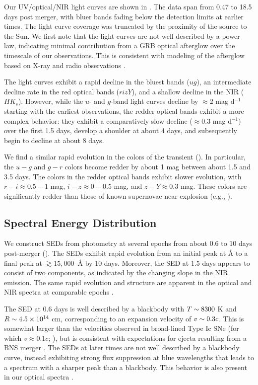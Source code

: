 Our UV/optical/NIR light curves are shown in . The data span from 0.47 to 18.5 days post merger, with bluer bands fading below the detection limits at earlier times.  The light curve coverage was truncated by the proximity of the source to the Sun.  We first note that the light curves are not well described by a power law, indicating minimal contribution from a GRB optical afterglow over the timescale of our observations. This is consistent with modeling of the afterglow based on X-ray and radio observations \citep{Alexander+17,Margutti+17}.

The light curves exhibit a rapid decline in the bluest bands ($ug$), an intermediate decline rate in the red optical bands ($rizY$), and a shallow decline in the NIR ($HK_s$).  However, while the $u$- and $g$-band light curves decline by $\approx 2$ mag d$^{-1}$ starting with the earliest observations, the redder optical bands exhibit a more complex behavior: they exhibit a comparatively slow decline ($\approx0.3$ mag d$^{-1}$) over the first 1.5 days, develop a shoulder at about 4 days, and subsequently begin to decline at about 8 days.

We find a similar rapid evolution in the colors of the transient ().  In particular, the $u-g$ and $g-r$ colors become redder by about 1 mag between about 1.5 and 3.5 days.  The colors in the redder optical bands exhibit slower evolution, with $r-i\approx 0.5-1$ mag, $i-z\approx 0-0.5$ mag, and $z-Y\approx 0.3$ mag.  These colors are significantly redder than those of known supernovae near explosion (e.g., \citealt{Folatelli+10,Bianco+14,Galbany+16}).

\subsection{Spectral Energy Distribution}
\label{sec:ch5_SED}

We construct SEDs from photometry at several epochs from about 0.6 to 10 days post-merger (). The SEDs exhibit rapid evolution from an initial peak at  $\mbox{\AA}$ to a final peak at $\gtrsim 15,000$~$\mbox{\AA}$ by 10 days.  Moreover, the SED at 1.5 days appears to consist of two components, as indicated by the changing slope in the NIR emission. The same rapid evolution and structure are apparent in the optical and NIR spectra at comparable epochs \citep{Chornock+17,Nicholl+17a}.

The SED at 0.6 days is well described by a blackbody with $T\sim 8300$ K and $R\sim 4.5\times 10^{14}$ cm, corresponding to an expansion velocity of $v\sim 0.3c$. This is somewhat larger than the velocities observed in broad-lined Type Ic SNe (for which $v\approx 0.1c$; \citealt{Modjaz+16}), but is consistent with expectations for ejecta resulting from a BNS merger \citep{Metzger2017}. The SEDs at later times are not well described by a blackbody curve, instead exhibiting strong flux suppression at blue wavelengths that leads to a spectrum with a sharper peak than a blackbody.  This behavior is also present in our optical spectra \citep{Nicholl+17a}.

